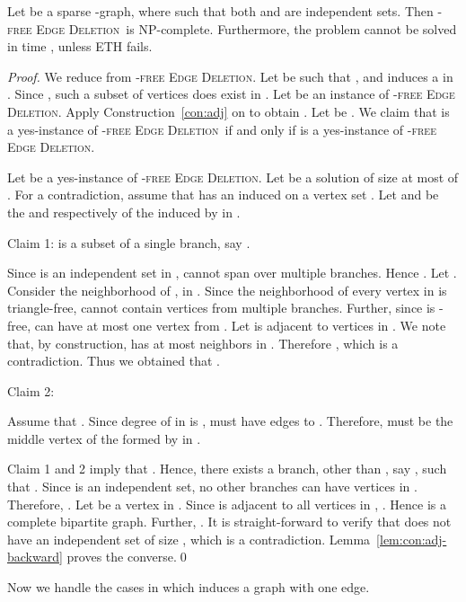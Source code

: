 \documentclass[envcountsame,envcountsect,10pt,oribibl]{llncs}
\newcommand{\pname}[1]{\textnormal{\textsc{#1}}}
\newcommand{\cclass}[1]{\textnormal{\textsf{#1}}}
\newcommand{\HED}{\pname{-free Edge Deletion}}
\newcommand{\PTED}{\pname{-free Edge Deletion}}
\newcommand{\NPC}{\cclass{NP-complete}}
\begin{document}
\begin{lemma}
  \label{lem:lhbipartite}
  Let  be a sparse -graph, where  such that both  and 
  are independent sets.
  Then \HED\ is \NPC. Furthermore, the problem cannot be solved in time
  , unless ETH fails.
\end{lemma}
\begin{proof}
  We reduce from \PTED. Let  be such that
  ,  and  induces a  in .
  Since , such a subset of vertices does exist in .
  Let  be an instance of \PTED.
  Apply Construction~\ref{con:adj} on 
  to obtain . Let  be . 
  We claim that  is a yes-instance of \PTED\ if and only if 
   is a yes-instance of \HED.

  Let  be a yes-instance of \PTED. Let  be a solution
  of size at most  of . For a contradiction, assume that
   has an induced  on a vertex set . Let  and
   be the  and  respectively of the  induced by
   in .

  Claim 1:  is a subset of a single branch, say .

  Since 
  is an independent set in , 
   cannot span over multiple branches. Hence .
  Let . Consider the neighborhood of ,  in .
  Since the neighborhood of every vertex in  is triangle-free,  cannot 
  contain vertices from multiple branches. Further, since  is -free, 
   can have at most one vertex from . Let  is adjacent to vertices in . 
  We note that, by construction, 
   has at most  neighbors in . Therefore , which is a contradiction.
  Thus we obtained that .

  Claim 2: 

  Assume that .
  Since degree of  in  is ,  must have 
  edges to . Therefore,  must be the middle vertex of the 
   formed by  in . 

  Claim 1 and 2 imply that . Hence,
  there exists a branch, other than
  , say , such that . Since  is an independent set,
  no other branches can have vertices in . Therefore,
  . Let  be a vertex in .
  Since  is adjacent to all vertices in , .
  Hence  is a complete bipartite graph. Further, .
  It is straight-forward to verify that  does not have an independent set of size 
  , which is a contradiction.
  Lemma~\ref{lem:con:adj-backward} proves the converse.\qed
\end{proof}


Now we handle the cases in which  induces a graph with one edge. 
\end{document}
